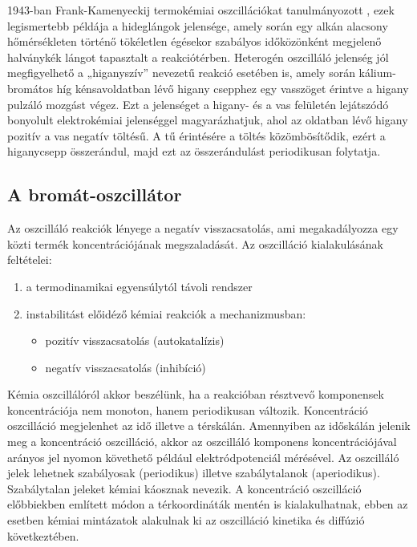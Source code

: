 1943-ban Frank-Kamenyeckij termokémiai oszcillációkat tanulmányozott \cite{frank1943nikov}, ezek legismertebb példája a hideglángok jelensége, amely során egy alkán alacsony hőmérsékleten történő tökéletlen égésekor szabályos időközönként megjelenő halványkék lángot tapasztalt a reakciótérben.
Heterogén oszcilláló jelenség jól megfigyelhető a „higanyszív” nevezetű reakció esetében is, amely során kálium-bromátos híg kénsavoldatban lévő higany csepphez egy vasszöget érintve a higany pulzáló mozgást végez. Ezt a jelenséget a higany- és a vas felületén lejátszódó bonyolult elektrokémiai jelenséggel magyarázhatjuk, ahol az oldatban lévő higany pozitív a vas negatív töltésű. A tű érintésére a töltés közömbösítődik, ezért a higanycsepp összerándul, majd ezt az összerándulást periodikusan folytatja.

\subsection{A bromát-oszcillátor} \label{bromatoszcillator}
Az oszcilláló reakciók lényege a negatív visszacsatolás, ami megakadályozza egy közti termék koncentrációjának megszaladását. Az oszcilláció kialakulásának feltételei:
\begin{enumerate}
\item a termodinamikai egyensúlytól távoli rendszer
\item instabilitást előidéző kémiai reakciók a mechanizmusban:
 \begin{itemize}
\item pozitív visszacsatolás (autokatalízis)
\item negatív visszacsatolás (inhibíció)
\end{itemize}
\end{enumerate}
Kémia oszcillálóról akkor beszélünk, ha a reakcióban résztvevő komponensek koncentrációja nem monoton, hanem periodikusan változik. Koncentráció oszcilláció megjelenhet az idő illetve a térskálán. Amennyiben az időskálán jelenik meg a koncentráció oszcilláció, akkor az oszcilláló komponens koncentrációjával arányos jel nyomon követhető például elektródpotenciál mérésével.\cite{miklososzcillalo}
Az oszcilláló jelek lehetnek szabályosak (periodikus) illetve szabálytalanok (aperiodikus). Szabálytalan jeleket kémiai káosznak nevezik. A koncentráció oszcilláció előbbiekben említett módon a térkoordináták mentén is kialakulhatnak, ebben az esetben kémiai mintázatok alakulnak ki az oszcilláció kinetika és diffúzió következtében.

